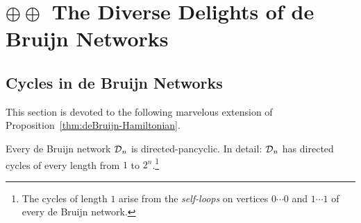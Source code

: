 \chapter{$\oplus \oplus$ The Diverse Delights of de Bruijn Networks}
\label{ch:de-Bruijn-delights}



\section{Cycles in de Bruijn Networks}
\label{Appendix:deBruijn-Pancyclic}

This section is devoted to the following marvelous extension of
Proposition~\ref{thm:deBruijn-Hamiltonian}.


\begin{prop}
\label{thm:deBruijn-pancyclic}
Every de Bruijn network $\mbox{$\cal D$}_n$ is directed-pancyclic.
In detail:  $\mbox{$\cal D$}_n$ has directed cycles of every length from $1$ to $2^n$.\footnote{The cycles of
length $1$ arise from  the {\it self-loops} on vertices $0 \cdots 0$ and $1 \cdots 1$ of every
de Bruijn network.}
\end{prop}


